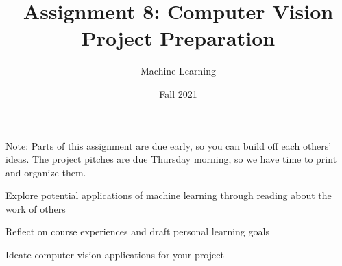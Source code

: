 \documentclass[assignment08_Solutions]{subfiles}
\title{Assignment 8: Computer Vision Project Preparation}
\author{Machine Learning}
\date{Fall 2021}
\begin{document}
\maketitle
\thispagestyle{firstpage}

Note: Parts of this assignment are due early, so you can build off each others' ideas. The project pitches are due Thursday morning, so we have time to print and organize them.
\vspace{2em}



\begin{learningobjectives}
\bi
\item Explore potential applications of machine learning through reading about the work of others
\item Reflect on course experiences and draft personal learning goals
\item Ideate computer vision applications for your project
\ei
\end{learningobjectives}


%
%
%
%
\end{document}
